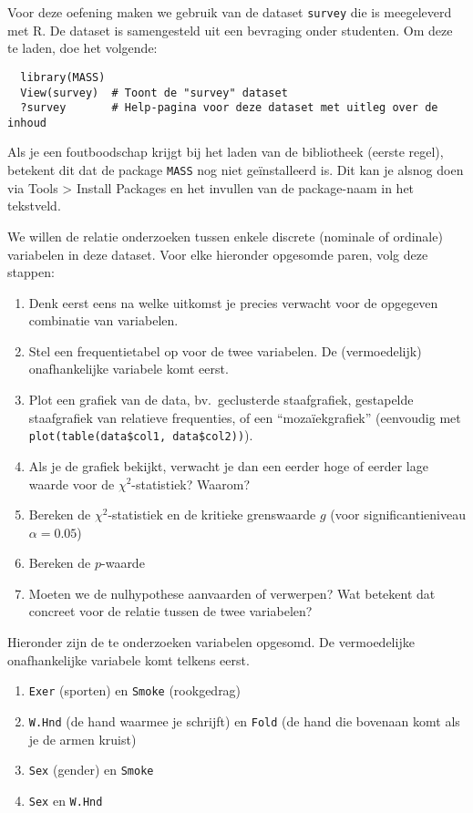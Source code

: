 \begin{exercise}
  \label{ex:chisq-survey}
  Voor deze oefening maken we gebruik van de dataset \texttt{survey} die is meegeleverd met R. De dataset is samengesteld uit een bevraging onder studenten. Om deze te laden, doe het volgende:
  
  \begin{lstlisting}
  library(MASS)
  View(survey)  # Toont de "survey" dataset
  ?survey       # Help-pagina voor deze dataset met uitleg over de inhoud
  \end{lstlisting}
  
  Als je een foutboodschap krijgt bij het laden van de bibliotheek (eerste regel), betekent dit dat de package \texttt{MASS} nog niet geïnstalleerd is. Dit kan je alsnog doen via Tools > Install Packages en het invullen van de package-naam in het tekstveld.
  
  We willen de relatie onderzoeken tussen enkele discrete (nominale of ordinale) variabelen in deze dataset. Voor elke hieronder opgesomde paren, volg deze stappen:
  
  \begin{enumerate}[label=(\alph*)]
    \item Denk eerst eens na welke uitkomst je precies verwacht voor de opgegeven combinatie van variabelen.
    \item Stel een frequentietabel op voor de twee variabelen. De (vermoedelijk) onafhankelijke variabele komt eerst.
    \item Plot een grafiek van de data, bv.~geclusterde staafgrafiek, gestapelde staafgrafiek van relatieve frequenties, of een ``mozaïekgrafiek'' (eenvoudig met \texttt{plot(table(data\$col1, data\$col2))}).
    \item Als je de grafiek bekijkt, verwacht je dan een eerder hoge of eerder lage waarde voor de $\chi^2$-statistiek? Waarom?
    \item Bereken de $\chi^2$-statistiek en de kritieke grenswaarde $g$ (voor significantieniveau $\alpha = 0.05$)
    \item Bereken de $p$-waarde
    \item Moeten we de nulhypothese aanvaarden of verwerpen? Wat betekent dat concreet voor de relatie tussen de twee variabelen?
  \end{enumerate}
  
  Hieronder zijn de te onderzoeken variabelen opgesomd. De vermoedelijke onafhankelijke variabele komt telkens eerst.
  
  \begin{enumerate}
    \item \texttt{Exer} (sporten) en \texttt{Smoke} (rookgedrag)
    \item \texttt{W.Hnd} (de hand waarmee je schrijft) en \texttt{Fold} (de hand die bovenaan komt als je de armen kruist)
    \item \texttt{Sex} (gender) en \texttt{Smoke}
    \item \texttt{Sex} en \texttt{W.Hnd}
  \end{enumerate}
\end{exercise}

